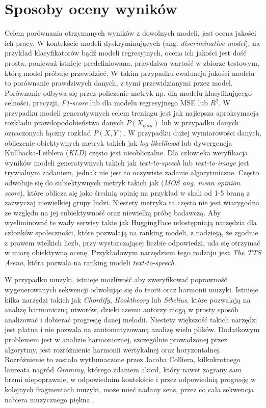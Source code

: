 \documentclass[data-science]{agh-wi} %
\begin{document}
\section{Sposoby oceny wyników}
Celem porównania otrzymanych wyników z dowolnych modeli, jest ocena jakości ich pracy. W kontekście modeli dyskryminujących (ang. \textit{discriminative model}), na przykład klasyfikatorów bądź modeli regresyjnych, ocena ich jakości jest dość prosta, ponieważ istnieje predefiniowana, prawdziwa wartość w zbiorze testowym, którą model próbuje przewidzieć. W takim przypadku ewaluacja jakości modelu to porównanie prawdziwych danych, z tymi przewidzianymi przez model. Porównanie odbywa się przez policzenie metryk np. dla modelu klasyfikującego celności, precyzji, \textit{F1-score} lub dla modelu regresyjnego MSE lub $R^2$. W przypadku modeli generatywnych celem treningu jest jak najlepsza aproksymacja rozkładu prawdopodobieństwa danych $P(X_{data})$ lub w przypadku danych oznaczonych łączny rozkład $P(X, Y)$. W przypadku dużej wymiarowości danych, obliczenie obiektywnych metryk takich jak \textit{log-likelihood} lub dywergencja Kullbacka-Leiblera (\textit{KLD}) często jest nieobliczalne. Dla człowieka weryfikacja wyników modeli generatywnych takich jak \textit{text-to-speech} lub \textit{text-to-image} jest trywialnym zadaniem, jednak nie jest to oczywiste zadanie algorytmiczne. Często odwołuje się do subiektywnych metryk takich jak (\textit{MOS ang. mean opinion score}), które oblicza się jako średnią opinię na przykład w skali od 1-5 braną z zazwyczaj niewielkiej grupy ludzi. Niestety metryka ta często nie jest wiarygodna ze względu na jej subiektywnośś oraz niewielką próbę badawczą. Aby wyeliminować te wady serwisy takie jak HuggingFace udostępniają narzędzia dla członków społeczności, które pozwalają na ranking modeli, z nadzieją, że zgodnie z prawem wielkich liczb, przy wystarczającej liczbie odpowiedzi, uda się otrzymać w miarę obiektywną ocenę. Przykładowym narzędziem tego rodzaju jest \textit{The TTS Arena}\cite{tts_arena}, która pozwala na ranking modeli \textit{text-to-speech}.

W przypadku muzyki, istnieje możliwość aby zweryfikować poprawność wygenerowanych sekwencji odwołując się do teorii oraz harmonii muzyki. Istnieje kilka narzędzi takich jak \textit{Chordify}, \textit{Hooktheory} lub \textit{Sibelius}, które pozwalają na analizę harmoniczną utworów, dzieki czemu autorzy mogą w prosty sposób analizować i dobierać progresję danej melodii. Niestety większość takich narzędzi jest płatna i nie pozwala na zautomatyzowaną analizę wielu plików. Dodatkowym problemem jest w analizie harmonicznej, szczególnie prowadzonej przez algorytmy, jest rozróżnienie harmonii wertykalnej oraz horyzontalnej. Rozróżnienie to zostało wytłumaczone przez Jacoba Colliera, kilkukrotnego laureata nagród \textit{Grammy}, którego zdaniem akord, który nawet zagrany sam brzmi niepoprawnie, w odpowiednim kontekście i przez odpowiednią progresję w kolejnych fragmentach muzyki, może mieć nadany sens, przez co cała sekwencja nabiera muzycznego piękna \cite{collier_wrongnote}.
\end{document}
